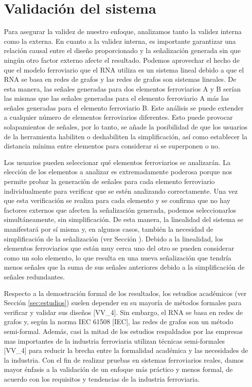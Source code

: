 \section{Validación del sistema}

    Para asegurar la validez de nuestro enfoque, analizamos tanto la validez interna como la externa. En cuanto a la validez interna, es importante garantizar una relación causal entre el diseño proporcionado y la señalización generada sin que ningún otro factor externo afecte el resultado. Podemos aprovechar el hecho de que el modelo ferroviario que el RNA utiliza es un sistema lineal debido a que el RNA se basa en redes de grafos y las redes de grafos son sistemas lineales. De esta manera, las señales generadas para dos elementos ferroviarios A y B serían las mismas que las señales generadas para el elemento ferroviario A más las señales generadas para el elemento ferroviario B. Este análisis se puede extender a cualquier número de elementos ferroviarios diferentes. Esto puede provocar solapamientos de señales, por lo tanto, se añade la posibilidad de que los usuarios de la herramienta habiliten o deshabiliten la simplificación, así como establecer la distancia mínima entre elementos para considerar si se superponen o no.

    Los usuarios pueden seleccionar qué elementos ferroviarios se analizarán. La elección de los elementos a analizar es extremadamente poderosa porque nos permite probar la generación de señales para cada elemento ferroviario individualmente para verificar que se estén analizando correctamente. Una vez que esta verificación se realiza para cada elemento y se confirma que no hay factores externos que afecten la señalización generada, podemos seleccionarlos simultáneamente, sin simplificación. De esta manera, la linealidad del sistema se manifestará por sí misma y, en algunos casos, también la necesidad de simplificación de la señalización (ver Sección \label{sec:simplificacion}). Debido a la linealidad, los elementos ferroviarios que están muy cerca uno del otro se pueden considerar como un solo elemento, lo que resulta en una nueva señalización que tendría menos señales que la suma de sus señales anteriores debido a la simplificación de señales redundantes.

    Respecto a la demostración formal de los resultados, los estudios académicos (ver Sección \ref{sec:estudios}) suelen depender en su mayoría de métodos formales para verificar y validar sus diseños [VV\_4]. Sin embargo, el RNA se basa en redes de grafos y, según la norma IEC 61508 [IEC], las redes de grafos son un método semi-formal. Además, casi la mitad de los estudios respaldados por las empresas mas importantes de la industria ferroviaria utilizan técnicas semi-formales [VV\_4] para reducir la brecha entre la formalidad académica y las necesidades de la industria. Con el fin de realizar pruebas en sistemas ferroviarios reales, damos mayor énfasis a la validación de un enfoque más práctico y menos formal, de acuerdo con los requisitos y tendencias de la industria ferroviaria.
    
